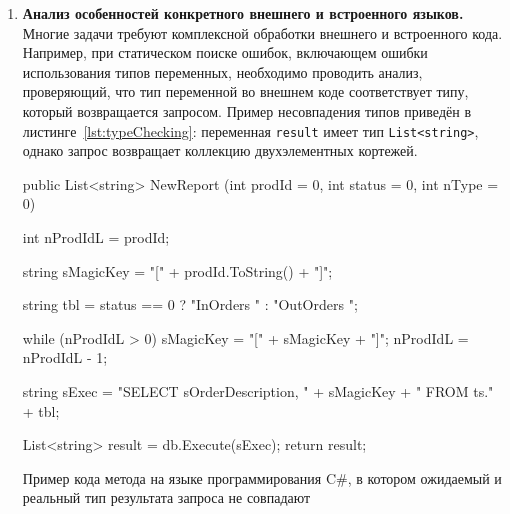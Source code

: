 \begin{enumerate}
  \item \textbf{Анализ особенностей конкретного внешнего и встроенного языков.} Многие задачи требуют комплексной обработки внешнего и встроенного кода. Например, при статическом поиске ошибок, включающем ошибки использования типов переменных, необходимо проводить анализ, проверяющий, что тип переменной во внешнем коде соответствует типу, который возвращается запросом. Пример несовпадения типов приведён в листинге~\ref{lst:typeChecking}: переменная \texttt{result} имеет тип \texttt{List<string>}, однако запрос возвращает коллекцию двухэлементных кортежей.
  
\begin{listing}
    \begin{pyglist}[language=csharp,numbers=left,numbersep=5pt]

public List<string> NewReport
  (int prodId = 0, int status = 0, int nType = 0)
{
    int nProdIdL = prodId;

    string sMagicKey = "[" + prodId.ToString() + "]";

    string tbl = status == 0 ? "InOrders " : "OutOrders ";

    while (nProdIdL > 0)
    {
        sMagicKey = "[" + sMagicKey + "]";
        nProdIdL = nProdIdL - 1;
    }

    string sExec =
        "SELECT sOrderDescription, " + sMagicKey
        + " FROM ts." + tbl;

    List<string> result = db.Execute(sExec);
    return result;
}
\end{pyglist}
\caption{Пример кода метода на языке программирования C\#, в котором ожидаемый и реальный тип результата запроса не совпадают}
\label{lst:typeChecking}
\end{listing}


\end{enumerate}
